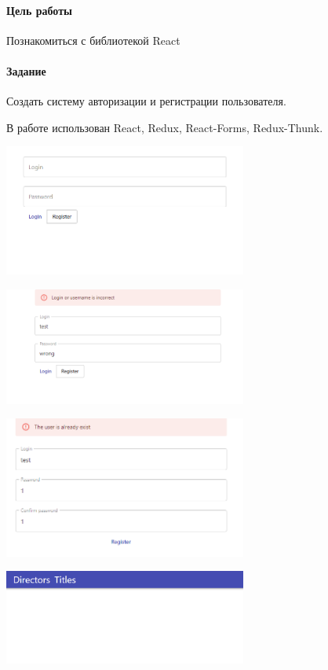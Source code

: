 \paragraph{Цель работы}
Познакомиться с библиотекой React

\paragraph{Задание}
Создать систему авторизации и регистрации пользователя.

В работе использован React, Redux, React-Forms, Redux-Thunk.






\includegraphics[width=0.6\textwidth]{scr1.PNG}

\includegraphics[width=0.6\textwidth]{scr2.PNG}

\includegraphics[width=0.6\textwidth]{scr3.PNG}

\includegraphics[width=0.6\textwidth]{scr4.PNG}
